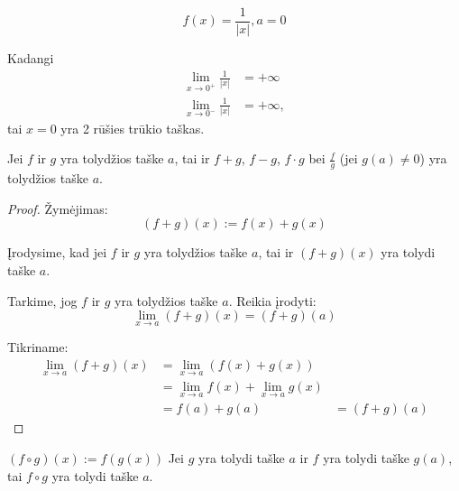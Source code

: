\begin{exmp}
  \begin{equation*}
    f(x) = \frac{1}{|x|}, a = 0
  \end{equation*}

  Kadangi
  \begin{align*}
    \lim _{x \to 0^{+}} \frac{1}{|x|} &= +\infty \\
    \lim _{x \to 0^{-}} \frac{1}{|x|} &= +\infty,
  \end{align*}
  tai $x = 0$ yra 2 rūšies trūkio taškas.
\end{exmp}

\begin{prop}
  Jei $f$ ir $g$ yra tolydžios taške $a$, tai ir 
  $f + g$, $f - g$, $f \cdot g$ bei $\frac{f}{g}$ (jei $g(a) \neq 0$) 
  yra tolydžios taške $a$.

  \begin{proof}
    Žymėjimas:
    \begin{equation*}
      (f + g)(x) := f(x) + g(x)
    \end{equation*}

    Įrodysime, kad jei $f$ ir $g$ yra tolydžios taške $a$, tai ir 
    $(f + g)(x)$ yra tolydi taške $a$.

    Tarkime, jog $f$ ir $g$ yra tolydžios taške $a$. Reikia įrodyti:
    \begin{equation*}
      \lim _{x \to a} (f + g)(x) = (f + g)(a)
    \end{equation*}

    Tikriname:
    \begin{align*}
      \lim _{x \to a} (f + g)(x)
      &= \lim _{x \to a} (f(x) + g(x)) \\
      &= \lim _{x \to a} f(x) + \lim _{x \to a} g(x) \\
      &= f(a) + g(a)
      &= (f + g)(a)
    \end{align*}
  \end{proof}
\end{prop}

\begin{prop}
  $ (f \circ g)(x) := f(g(x))$ Jei $g$ yra tolydi taške $a$ ir 
  $f$ yra tolydi taške $g(a)$, tai $f \circ g$ yra tolydi taške $a$.
\end{prop}
